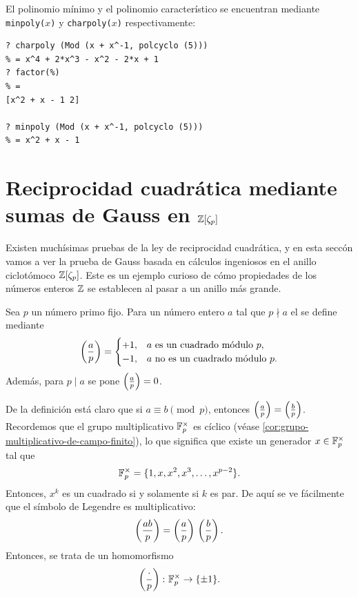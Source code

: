 El polinomio mínimo y el polinomio característico se encuentran mediante
\texttt{minpoly($x$)} y \texttt{charpoly($x$)} respectivamente:
\begin{shaded}
\begin{verbatim}
? charpoly (Mod (x + x^-1, polcyclo (5)))
% = x^4 + 2*x^3 - x^2 - 2*x + 1
? factor(%)
% = 
[x^2 + x - 1 2]

? minpoly (Mod (x + x^-1, polcyclo (5)))
% = x^2 + x - 1
\end{verbatim}
\end{shaded}


\section{Reciprocidad cuadrática mediante sumas de Gauss en \texorpdfstring{$\mathbb{Z} [\zeta_p]$}{ℤ[ζₚ]}}
\label{sec:reciprocidad-cuadratica}


Existen muchísimas pruebas de la ley de reciprocidad cuadrática, y en esta
seccón vamos a ver la prueba de Gauss basada en cálculos ingeniosos en el anillo
ciclotómoco $\mathbb{Z} [\zeta_p]$. Este es un ejemplo curioso de cómo propiedades
de los números enteros $\mathbb{Z}$ se establecen al pasar a un anillo más grande.

\begin{definicion}
  Sea $p$ un número primo fijo. Para un número entero $a$ tal que $p\nmid a$
  el  se define mediante
  \[ \left(\frac{a}{p}\right) = \begin{cases}
    +1, & a\text{ es un cuadrado módulo }p,\\
    -1, & a\text{ no es un cuadrado módulo }p.
  \end{cases} \]
  Además, para $p \mid a$ se pone $\left(\frac{a}{p}\right) = 0$.
\end{definicion}

De la definición está claro que si $a \equiv b \pmod{p}$, entonces
$\left(\frac{a}{p}\right) = \left(\frac{b}{p}\right)$. Recordemos que el grupo multiplicativo
$\mathbb{F}_p^\times$ es cíclico
(véase \ref{cor:grupo-multiplicativo-de-campo-finito}), lo que significa que
existe un generador $x\in \mathbb{F}_p^\times$ tal que
$$\mathbb{F}_p^\times = \{ 1, x, x^2, x^3, \ldots, x^{p-2} \}.$$
Entonces, $x^k$ es un cuadrado si y solamente si $k$ es par.
De aquí se ve fácilmente que el símbolo de Legendre es multiplicativo:
$$\left(\frac{ab}{p}\right) = \left(\frac{a}{p}\right)\,\left(\frac{b}{p}\right).$$
Entonces, se trata de un homomorfismo
$$\left(\frac{\cdot}{p}\right)\colon \mathbb{F}_p^\times \to \{ \pm 1 \}.$$

